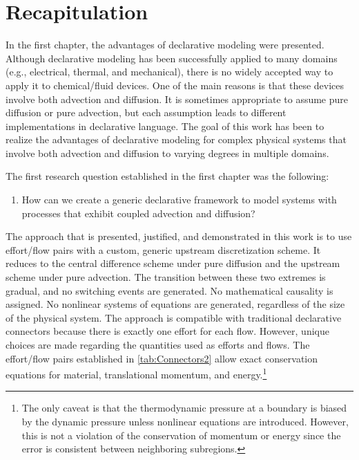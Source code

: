 \glsresetall


\section{Recapitulation}

In the first chapter, the advantages of declarative modeling were presented.  Although declarative modeling has been successfully applied to many domains (e.g., electrical, thermal, and mechanical), there is no widely accepted way to apply it to chemical\slash{}fluid devices.  One of the main reasons is that these devices involve both advection and diffusion.  It is sometimes appropriate to assume pure diffusion or pure advection, but each assumption leads to different implementations in declarative language.  The goal of this work has been to realize the advantages of declarative modeling for complex physical systems that involve both advection and diffusion to varying degrees in multiple domains.  

The first research question established in the first chapter was the following:
\begin{enumerate}[\bfseries RQ1:]
  \item How can we create a generic declarative framework to model systems with processes that exhibit coupled advection and diffusion?
\end{enumerate}
The approach that is presented, justified, and demonstrated in this work is to use effort\slash{}flow pairs with a custom, generic upstream discretization scheme.  It reduces to the central difference scheme under pure diffusion and the upstream scheme under pure advection.  The transition between these two extremes is gradual, and no switching events are generated.  No mathematical causality is assigned.  No nonlinear systems of equations are generated, regardless of the size of the physical system.  The approach is compatible with traditional declarative connectors because there is exactly one effort for each flow.  However, unique choices are made regarding the quantities used as efforts and flows.  The effort\slash{}flow pairs established in \autoref{tab:Connectors2} allow exact conservation equations for material, translational momentum, and energy.\footnote{The only caveat is that the thermodynamic pressure at a boundary is biased by the dynamic pressure unless nonlinear equations are introduced.  However, this is not a violation of the conservation of momentum or energy since the error is consistent between neighboring subregions.}


